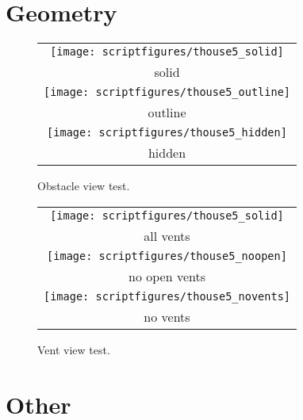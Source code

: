 \section{Geometry}
\begin{figure}[\figoptions]
\begin{center}
\begin{tabular}{c}
 \texttt{[image: scriptfigures/thouse5\_solid]}\\
 solid\\
 \texttt{[image: scriptfigures/thouse5\_outline]}\\
 outline\\
 \texttt{[image: scriptfigures/thouse5\_hidden]}\\
 hidden\\

 \end{tabular}
\end{center}
 \caption{Obstacle view test.}
\label{figobstest}%
\end{figure}

\begin{figure}[\figoptions]
\begin{center}
\begin{tabular}{c}
 \texttt{[image: scriptfigures/thouse5\_solid]}\\
 all vents\\
 \texttt{[image: scriptfigures/thouse5\_noopen]}\\
 no open vents\\
 \texttt{[image: scriptfigures/thouse5\_novents]}\\
 no vents\\

 \end{tabular}
\end{center}
 \caption{Vent view test.}
\label{figventest}%
\end{figure}


\section{Other}
